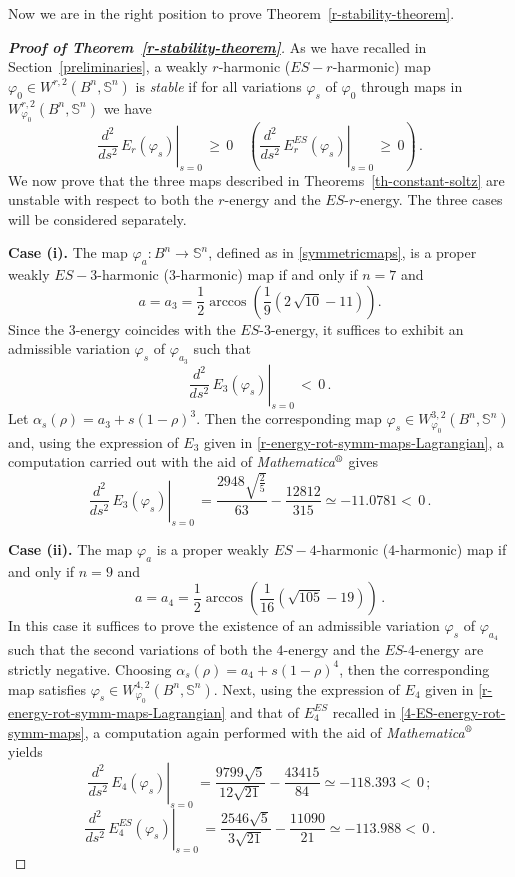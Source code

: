 \documentclass[11pt]{amsart}
\theoremstyle{plain}
\theoremstyle{definition}
\numberwithin{equation}{section}
\def \s{{\mathbb S}}
\numberwithin{equation}{section}
\begin{document}
\vspace{3mm}
Now we are in the right position to prove Theorem~\ref{r-stability-theorem}.

\begin{proof}[\textbf{Proof of Theorem~\ref{r-stability-theorem}}] 
As we have recalled in Section~\ref{preliminaries}, a  weakly $r$-harmonic ($ES-r$-harmonic) map $\varphi_0 \in W^{r,2}\left ( B^n,\s^n \right )$ is  \textit{stable} if
for all variations $\varphi_s$ of $\varphi_0$ through maps in $W_{\varphi_0}^{r,2}\left ( B^n,\s^n \right )$ we have 
\begin{equation}\label{second-variation-r}
 \left . \frac{d^2}{ds^2}\,E_r\left( \varphi_s \right ) \right |_{s=0} \, \geq \, 0 \quad \left( \left . \frac{d^2}{ds^2}\,E_r^{ES}\left( \varphi_s \right ) \right |_{s=0} \, \geq \, 0\right)\,.
\end{equation}
We now prove that the three maps described in Theorems~\ref{th-constant-soltz} 
are unstable with respect to both the $r$-energy and the $ES$-$r$-energy. 
The three cases will be considered separately.

\noindent
\textbf{Case (i).} The map $\varphi_a:B^n \to \s^n$, defined as in \eqref{symmetricmaps}, is a proper weakly $ES-3$-harmonic ($3$-harmonic) map if and only if $n=7$ and 
\[
a=a_3=\dfrac{1}{2} \arccos\left(\dfrac{1}{9} \left(2\,\sqrt{10}-11\right)\right).
\]
Since the $3$-energy coincides with the $ES$-$3$-energy, 
it suffices to exhibit an admissible variation $\varphi_s$ of $\varphi_{a_3}$ such that
\[
\left . \frac{d^2}{ds^2}\,E_3\left( \varphi_s \right ) \right |_{s=0} \, < \, 0\,.
\]
Let $\alpha_s(\rho)=a_3+s (1-\rho)^3$. Then the corresponding map $\varphi_s\in W_{\varphi_0}^{3,2}\left ( B^n,\s^n \right )$ and, 
using the expression of $E_3$ given in \eqref{r-energy-rot-symm-maps-Lagrangian}, a computation carried out with the aid of  \textit{Mathematica}${}^{ \text{\textregistered}} $ gives
\[
\left . \frac{d^2}{ds^2}\,E_3\left( \varphi_s \right ) \right |_{s=0} \,=  \frac{2948 \sqrt{\frac{2}{5}}}{63}-\frac{12812}{315}\simeq -11.0781 < \, 0\,.
\]

\noindent
\textbf{Case (ii).}  The map $\varphi_a$ is a proper weakly $ES-4$-harmonic ($4$-harmonic) map if and only if $n=9$ and
\[
a=a_4=\dfrac{1}{2} \arccos\left(\dfrac{1}{16} \left(\sqrt{105}-19\right)\right) \,.
\]
In this case it suffices to prove the existence of an admissible variation $\varphi_s$ of $\varphi_{a_4}$ such that the second variations of both the $4$-energy and the $ES$-$4$-energy are strictly negative. Choosing $\alpha_s(\rho)=a_4+s (1-\rho)^4$, then the corresponding map satisfies $\varphi_s\in W_{\varphi_0}^{4,2}\left ( B^n,\s^n \right )$. Next, 
using the expression of $E_4$ given in \eqref{r-energy-rot-symm-maps-Lagrangian} and that of $E_4^{ES}$ recalled in \eqref{4-ES-energy-rot-symm-maps}, a computation again performed with the aid of \textit{Mathematica}${}^{ \text{\textregistered}} $ yields  
\[
\left . \frac{d^2}{ds^2}\,E_4\left( \varphi_s \right ) \right |_{s=0} \,=  \frac{9799 \sqrt{5}}{12\sqrt{21}}-\frac{43415}{84}\simeq -118.393 < \, 0\,;
\]
\[
\left . \frac{d^2}{ds^2}\,E_4^{ES}\left( \varphi_s \right ) \right |_{s=0} \,=  \frac{2546 \sqrt{5}}{3\sqrt{21}}-\frac{11090}{21}\simeq -113.988 < \, 0\,.
\]


\end{proof}
\end{document}

